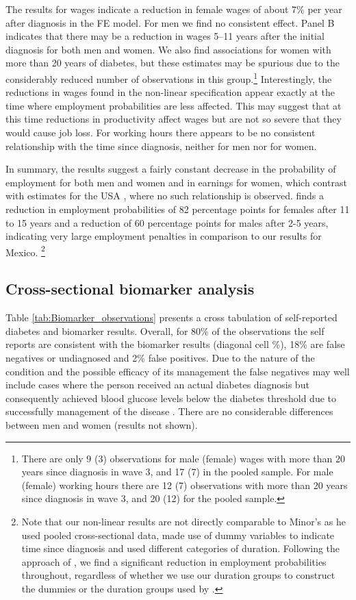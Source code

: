 \documentclass[12pt,english]{article}
\begin{document}
The results for wages indicate a reduction in female wages of about 7\% per year after diagnosis in the \ac{FE} model. For men we find no consistent effect. Panel B indicates that there may be a reduction in wages 5--11 years after the initial diagnosis for both men and women. We also find associations for women with more than 20 years of diabetes, but these estimates may be spurious due to the considerably reduced number of observations in this group.\footnote{There are only 9 (3) observations for male (female) wages with more than 20 years since diagnosis in wave 3, and 17 (7) in the pooled sample. For male (female) working hours there are 12 (7) observations with more than 20 years since diagnosis in wave 3, and 20 (12) for the pooled sample.} Interestingly, the reductions in wages found in the non-linear specification appear exactly at the time where employment probabilities are less affected. This may suggest that at this time reductions in productivity affect wages but are not so severe that they would cause job loss. For working hours there appears to be no consistent relationship with the time since diagnosis, neither for men nor for women.


In summary, the results suggest a fairly constant decrease in the probability of employment for both men and women and in earnings for women, which contrast with estimates for the USA \parencite{Minor2013}, where no such relationship is observed.  \textcite{Minor2013} finds a reduction in employment probabilities of 82 percentage points for females after 11 to 15 years and a reduction of 60 percentage points for males after 2-5 years, indicating very large employment penalties in comparison to our results for Mexico. \footnote{Note that our non-linear results are not directly comparable to Minor's as he used pooled cross-sectional data, made use of dummy variables to indicate time since diagnosis and used different categories of duration. Following the approach of \textcite{Minor2013}, we find a significant reduction in employment probabilities throughout, regardless of whether we use our duration groups to construct the dummies or the duration groups used by \textcite{Minor2013}.} 




\FloatBarrier

\subsection{Cross-sectional biomarker analysis}


Table \ref{tab:Biomarker_observations} presents a cross tabulation of self-reported diabetes and biomarker results. Overall, for 80\% of the observations the self reports are consistent with the biomarker results (diagonal cell \%), 18\% are false negatives or undiagnosed and 2\% false positives. Due to the nature of the condition and the possible efficacy of its management the false negatives may well include cases where the person received an actual diabetes diagnosis but consequently achieved blood glucose levels below the diabetes threshold due to successfully management of the disease \parencite{Flores-Hernandez2015}.  There are no considerable differences between men and women (results not shown). 
\end{document}
